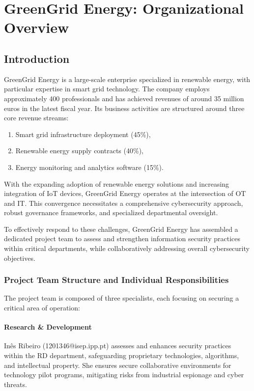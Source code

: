 \chapter{GreenGrid Energy: Organizational Overview}

\section{Introduction}

GreenGrid Energy is a large-scale enterprise \cite{Portugal2020} specialized in renewable energy, with particular expertise in smart grid technology. The company employs approximately 400 professionals and has achieved revenues of around 35 million euros in the latest fiscal year. Its business activities are structured around three core revenue streams:
\begin{enumerate}
    \item Smart grid infrastructure deployment (45\%),
    \item Renewable energy supply contracts (40\%),
    \item Energy monitoring and analytics software (15\%).
\end{enumerate}

With the expanding adoption of renewable energy solutions and increasing integration of \ac{IoT} devices, GreenGrid Energy operates at the intersection of \ac{OT} and \ac{IT}. This convergence necessitates a comprehensive cybersecurity approach, robust governance frameworks, and specialized departmental oversight.

To effectively respond to these challenges, GreenGrid Energy has assembled a dedicated project team to assess and strengthen information security practices within critical departments, while collaboratively addressing overall cybersecurity objectives.

\subsection{Project Team Structure and Individual Responsibilities}

The project team is composed of three specialists, each focusing on securing a critical area of operation:

\subsubsection*{Research \& Development}
Inês Ribeiro (1201346@isep.ipp.pt) assesses and enhances security practices within the \ac{RD} department, safeguarding proprietary technologies, algorithms, and intellectual property. She ensures secure collaborative environments for technology pilot programs, mitigating risks from industrial espionage and cyber threats.

